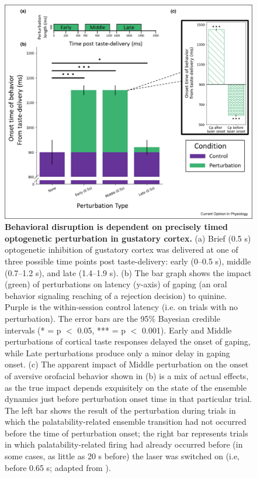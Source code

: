 \begin{refsection}
\begin{figure}
\includegraphics[width=\linewidth]{lin_2021_review_figs/1-s2.0-S2468867320301693-gr3_lrg.jpg}
\caption{\textbf{Behavioral disruption is dependent on precisely timed optogenetic perturbation in gustatory cortex.} (a) Brief (0.5 s) optogenetic inhibition of gustatory cortex was delivered at one of three possible time points post taste-delivery: early (0–0.5 s), middle (0.7–1.2 s), and late (1.4–1.9 s). (b) The bar graph shows the impact (green) of perturbations on latency (y-axis) of gaping (an oral behavior signaling reaching of a rejection decision) to quinine. Purple is the within-session control latency (i.e. on trials with no perturbation). The error bars are the 95\% Bayesian credible intervals (* = p \(<\) 0.05, *** = p \(<\) 0.001). Early and Middle perturbations of cortical taste responses delayed the onset of gaping, while Late perturbations produce only a minor delay in gaping onset. (c) The apparent impact of Middle perturbation on the onset of aversive orofacial behavior shown in (b) is a mix of actual effects, as the true impact depends exquisitely on the state of the ensemble dynamics just before perturbation onset time in that particular trial. The left bar shows the result of the perturbation during trials in which the palatability-related ensemble transition had not occurred before the time of perturbation onset; the right bar represents trials in which palatability-related firing had already occurred before (in some cases, as little as 20 s before) the laser was switched on (i.e, before 0.65 s; adapted from \cite{mukherjee2019a}).}
\label{fig:wrapfig}
\end{figure}


\end{refsection}
